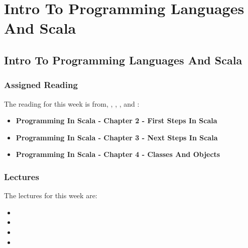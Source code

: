 \clearpage

\newcommand{\ChapTitle}{Intro To Programming Languages And Scala}
\newcommand{\SectionTitle}{Intro To Programming Languages And Scala}

\chapter{\ChapTitle}

\section{\SectionTitle}

\subsection{Assigned Reading}

The reading for this week is from, \AtomicScalaBook, \EssOfPPLBook, \FuncOfPPLBook, and \ProgInScalaBook:

\begin{itemize}
    \item \textbf{Programming In Scala - Chapter 2 - First Steps In Scala}
    \item \textbf{Programming In Scala - Chapter 3 - Next Steps In Scala}
    \item \textbf{Programming In Scala - Chapter 4 - Classes And Objects}
\end{itemize}

\subsection{Lectures}

The lectures for this week are:

\begin{itemize}
    \item {}
    \item {}
    \item {}
    \item {}
\end{itemize}


